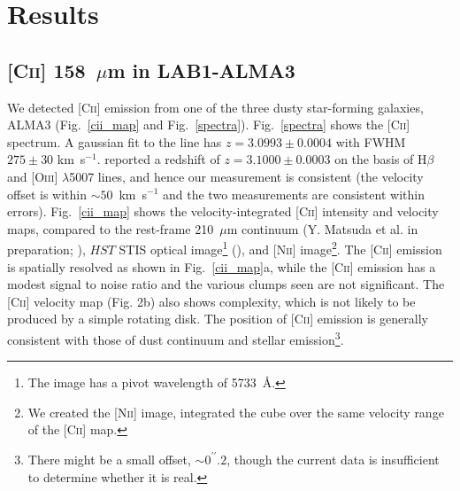 \documentclass[apj]{emulateapj}
\begin{document}
\section{Results}

\subsection{\textsc{[Cii]} 158~$\mu$m in LAB1-ALMA3}

We detected \textsc{[Cii]} emission from one of the three dusty star-forming galaxies, ALMA3 (Fig.~\ref{cii_map} and Fig.~\ref{spectra}).
Fig.~\ref{spectra} shows the \textsc{[Cii]} spectrum.
A gaussian fit to the line has $z=3.0993\pm0.0004$ with FWHM $275\pm30$ km~s$^{-1}$.
\citet{2015ApJ...799...38K} reported a redshift of $z=3.1000\pm0.0003$ on the basis of H$\beta$ and \textsc{[Oiii]} $\lambda$5007 lines, and hence our measurement is  consistent (the velocity offset is within $\sim50$~km~s$^{-1}$ and the two measurements are consistent within errors).
Fig.~\ref{cii_map} shows the velocity-integrated \textsc{[Cii]} intensity and velocity maps, compared to the rest-frame 210~$\mu$m continuum (Y. Matsuda et al. in preparation; \citealt{2016ApJ...832...37G}),  $HST$ STIS optical image\footnote{The image has a pivot wavelength of 5733~\AA.} (\citealt{2003ApJ...599...92C}), and \textsc{[Nii]} image\footnote{We created the \textsc{[Nii]} image, integrated the cube over the same velocity range of the \textsc{[Cii]} map.}.
The \textsc{[Cii]} emission is spatially resolved as shown in Fig.~\ref{cii_map}a, while
the \textsc{[Cii]} emission has a modest signal to noise ratio and the various clumps seen are not significant.
The \textsc{[Cii]} velocity map (Fig. 2b) also shows complexity, which is not likely to be produced by a simple rotating disk.
The position of \textsc{[Cii]} emission is generally consistent with those of dust continuum and stellar emission\footnote{There might be a small offset, $\sim0^{\prime\prime}.2$, though the current data is insufficient to determine whether it is real.}.
\end{document}

